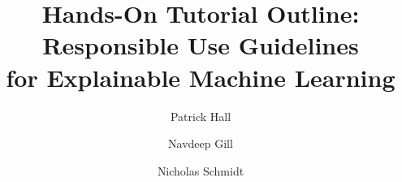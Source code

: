 \documentclass[sigconf]{acmart}
\begin{document}
\title[Responsible XAI]{\huge{Hands-On Tutorial Outline: Responsible Use Guidelines\\ for Explainable Machine Learning}}


\author{Patrick Hall}

\author{Navdeep Gill}

\author{Nicholas Schmidt }

\renewcommand{\shortauthors}{Hall, Gill, \& Schmidt}

%

%
%



		
		
\end{document}
